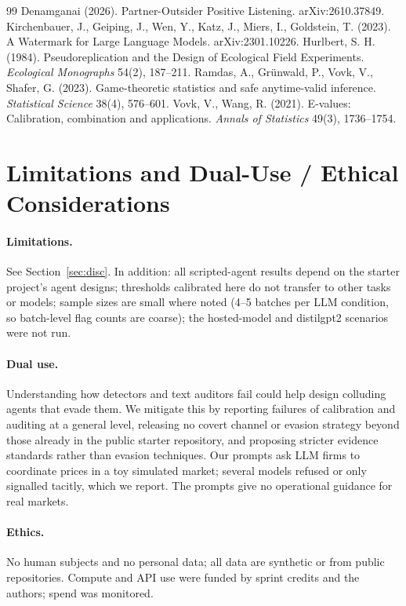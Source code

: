 \documentclass[10pt]{article}
\begin{document}
\begin{thebibliography}{99}
 Denamganai (2026). Partner-Outsider Positive Listening. arXiv:2610.37849.
 Kirchenbauer, J., Geiping, J., Wen, Y., Katz, J., Miers, I., Goldstein, T. (2023). A Watermark for Large Language Models. arXiv:2301.10226.
 Hurlbert, S. H. (1984). Pseudoreplication and the Design of Ecological Field Experiments. \emph{Ecological Monographs} 54(2), 187--211.
 Ramdas, A., Gr\"unwald, P., Vovk, V., Shafer, G. (2023). Game-theoretic statistics and safe anytime-valid inference. \emph{Statistical Science} 38(4), 576--601.
 Vovk, V., Wang, R. (2021). E-values: Calibration, combination and applications. \emph{Annals of Statistics} 49(3), 1736--1754.
\end{thebibliography}

\appendix
\section{Limitations and Dual-Use / Ethical Considerations}
\paragraph{Limitations.} See Section~\ref{sec:disc}. In addition: all scripted-agent results depend on the starter project's agent designs; thresholds calibrated here do not transfer to other tasks or models; sample sizes are small where noted (4--5 batches per LLM condition, so batch-level flag counts are coarse); the hosted-model and distilgpt2 scenarios were not run.
\paragraph{Dual use.} Understanding how detectors and text auditors fail could help design colluding agents that evade them. We mitigate this by reporting failures of calibration and auditing at a general level, releasing no covert channel or evasion strategy beyond those already in the public starter repository, and proposing stricter evidence standards rather than evasion techniques. Our prompts ask LLM firms to coordinate prices in a toy simulated market; several models refused or only signalled tacitly, which we report. The prompts give no operational guidance for real markets.
\paragraph{Ethics.} No human subjects and no personal data; all data are synthetic or from public repositories. Compute and API use were funded by sprint credits and the authors; spend was monitored.
\end{document}
